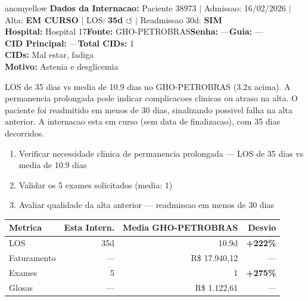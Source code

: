 \documentclass[a4paper,10pt]{article}
\begin{document}
\begin{anomalycard}[Internacao 165893 | GHO-PETROBRAS | MODERADO (z=2.42)]{anomyellow}
\textbf{Dados da Internacao:} Paciente 38973 $\mid$ Admissao: 16/02/2026 $\mid$ Alta: \textcolor{anomorange}{\textbf{EM CURSO}} $\mid$ LOS: \textbf{35d \textcolor{anomorange}{$\circlearrowleft$}} $\mid$ Readmissao 30d: \textcolor{anomred}{\textbf{SIM}}\\
\textbf{Hospital:} Hospital 17\quad\textbf{Fonte:} GHO-PETROBRAS\quad\textbf{Senha:} ---\quad\textbf{Guia:} ---\\
\textbf{CID Principal:} {\small ---}\quad\textbf{Total CIDs:} 1\\

\textbf{CIDs:} {\scriptsize Mal estar, fadiga}\\

\textbf{Motivo:} {\scriptsize Astenia e desglicemia}\\

\vspace{2pt}\begin{tcolorbox}[colback=severityred!20,colframe=anomyellow,title={\textbf{Interpretacao de Negocio}},fonttitle=\bfseries\small,left=4pt,right=4pt,top=3pt,bottom=3pt]
{\small LOS de 35 dias vs media de 10.9 dias no GHO-PETROBRAS (3.2x acima). A permanencia prolongada pode indicar complicacoes clinicas ou atraso na alta. O paciente foi readmitido em menos de 30 dias, sinalizando possivel falha na alta anterior. A internacao esta em curso (sem data de finalizacao), com 35 dias decorridos.}
\end{tcolorbox}
\begin{tcolorbox}[colback=severityyellow!30,colframe=anomorange,title={\textbf{Recomendacoes Especificas}},fonttitle=\bfseries\small,left=4pt,right=4pt,top=3pt,bottom=3pt]
\begin{enumerate}[nosep,leftmargin=16pt]
\item {\small Verificar necessidade clinica de permanencia prolongada --- LOS de 35 dias vs media de 10.9 dias}
\item {\small Validar os 5 exames solicitados (media: 1)}
\item {\small Avaliar qualidade da alta anterior --- readmissao em menos de 30 dias}
\end{enumerate}
\end{tcolorbox}
\begin{center}\begin{tabular}{l r r r}\toprule\textbf{Metrica} & \textbf{Esta Intern.} & \textbf{Media GHO-PETROBRAS} & \textbf{Desvio} \\\midrule
LOS & 35d & 10.9d & \textcolor{anomred}{\textbf{+222\%}} \\
Faturamento & --- & R\$ 17.940,12 & --- \\
Exames & 5 & 1 & \textcolor{anomred}{\textbf{+275\%}} \\
Glosas & --- & R\$ 1.122,61 & --- \\
\bottomrule\end{tabular}\end{center}


\end{anomalycard}
\end{document}

